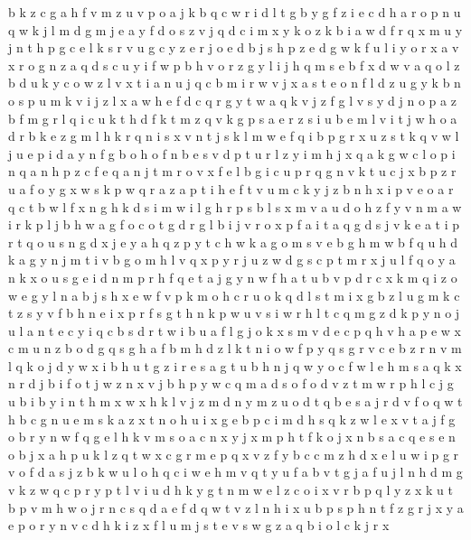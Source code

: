 \documentclass{article}
\begin{document}
b k z c g a h f v m
z u v p o a j k b q c w r i d l t g
b y g f z i e c d h a r o p n u q w k j l m
d g
m j e a y f d o
s z v j q d c i m x y k
o z k b i a w d f r q x m u y j n t h p g c e l
k s r v u g c y z e
r j o e d b
j s h p z e d g w k f u l i y o r x a v
x r o g n z a q d s c u y i f w p b h v
o r z g y l i j h q m s e b f x d w v a
q o l z b d u k y
c o w z l v x t i a n u j
q c b m i r w v j x a s t e o n f l d z u g y k
b n o s p u m k v i j z l x a w h e f d c q r g y t
w a q k v j z f g l
v s y d j n o p a z b f m g r l q i c u k t h
d f k t m z q v
k g p s a e r z
s i u b e m
l v i t j w h o a d r b k e
z g m l h k r q n i s x
v n t j s k l m w e f q i b p g r x u
z s t k q v w l j u e p i d a y n f g b o h
o f n b e s v d p t u r l z y i m h j x q a k g w c
l o p i n
q a n h p z c f e
q a n j t m r o v x f e l b g i c u p
r q g n v k t u c j x b p z
r u a f o y g x w s
k p w q r a z
a p t i h e
f t v u m c k y j z b n h x i p
v e o a r q c t b w l f x n g h k d s i m
w i l g h r p s b
l s x m v a u d
o h
z f y v n m a w i r k p l j b h
w a g f o c
o t g d r
g l b i j v r o x p f a
i t a q g
d s j v k e a t i p
r t q o u s n g d x j e y a h
q z p y t c h w k a g o m s v e b
g h
m
w b f q u h d k a g y n j m t i v
b g o m h l v q x p y r j u z w d
g s c p t m r x j u l f q o y a n
k x o u s g e i d n m p
r h f q e t a j g y n w
f h a t u b v p d r c x k m q i z o w e g y l n
a b j s h x e w f v p k m o
h c r u o k q d l s t m i x g b z
l u g m k c t z s y v f b h n e i x p r
f s g t h n k p w u
v s i w r h l t c q m g z d k p y n o j
u l a n t e c
y i q c b s d
r t w i b u a f l g j o k x s m v d e c p q h
v h a p e w x c m u n z b o d g q s
g h a f b
m h d z l k t n i o w f p y q s g r v c e b
z r n v m l q k o j d y w x i b h u t g
z i r e s a g t u b h n j q w
y o c f w l e h m s a q k x n r d j b
i f o t j w z n x
v j b h p y w c q m a d s o
f o d v z t m w r p h l c j g u b i
b y i n t h m x
w x h k l v j z m d n
y m z u o d t q b e
s a j
r d v f o q w t h b c g n u e m s k a z x
t n o h u i x g e b
p c i m d h s q k z w l e x v t a j f g o b r y n
w f q g e l h k v m s o a c n x y
j x m
p
h t f k o j x n b s a c q e
s e n o
b j x a
h p u k l z q t w x c g r m e
p q x v z f
y b c
c m z h d x e l u w i p g r v o f
d a s j z b k w u l o h q
c i w e h m v q t y u f a b
v t g j a
f u j l n h d m g v k z
w q c p r y
p t l v i
u d h k y g t n m w e l z c o i x v r b p q
l y z x k u t b p v m h w o j r n c s q d a e f
d q w t v z l n h i x u b p
s p h n t f z g r j x y a e
p o r y n v c d h k i z x f l u m j s t e
v s w g z a q b i o l c k j r x
\end{document}
